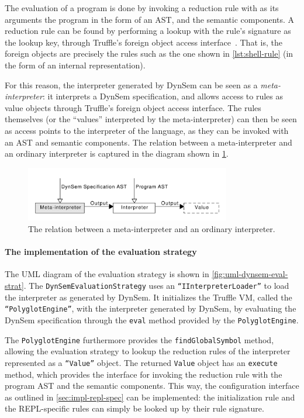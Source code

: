 The evaluation of a program is done by invoking a reduction rule with as its
arguments the program in the form of an AST, and the semantic components. A
reduction rule can be found by performing a lookup with the rule's signature as
the lookup key, through Truffle's foreign object access
interface~\cite{Grimmer15}. That is, the foreign objects are precisely the rules
such as the one shown in \cref{lst:shell-rule} (in the form of an internal
representation).

For this reason, the interpreter generated by DynSem can be seen as a
\textit{meta-interpreter}: it interprets a DynSem specification, and allows
access to rules as value objects through Truffle's foreign object access
interface. The rules themselves (or the ``values'' interpreted by the
meta-interpreter) can then be seen as access points to the interpreter of the
language, as they can be invoked with an AST and semantic components. The
relation between a meta-interpreter and an ordinary interpreter is captured in
the diagram shown in \cref{fig:meta-interpreter}.

\begin{figure}[b]
  \centering
  \includegraphics[width=0.8\textwidth]{meta-interpreter}
  \caption{The relation between a meta-interpreter and an ordinary interpreter.}
  \label{fig:meta-interpreter}
\end{figure}

\paragraph{The implementation of the evaluation strategy} The UML diagram of the
evaluation strategy is shown in \cref{fig:uml-dynsem-eval-strat}. The
\texttt{DynSemEvaluationStrategy} uses an \texttt{``IInterpreterLoader''} to
load the interpreter as generated by DynSem. It initializes the Truffle VM,
called the \texttt{``PolyglotEngine''}, with the interpreter generated by
DynSem, by evaluating the DynSem specification through the \texttt{eval} method
provided by the \texttt{PolyglotEngine}.

The \texttt{PolyglotEngine} furthermore provides the \texttt{findGlobalSymbol}
method, allowing the evaluation strategy to lookup the reduction rules of the
interpreter represented as a \texttt{``Value''} object. The returned
\texttt{Value} object has an \texttt{execute} method, which provides the
interface for invoking the reduction rule with the program AST and the semantic
components. This way, the configuration interface as outlined in
\cref{sec:impl-repl-spec} can be implemented: the initialization rule and the
REPL-specific rules can simply be looked up by their rule signature.

